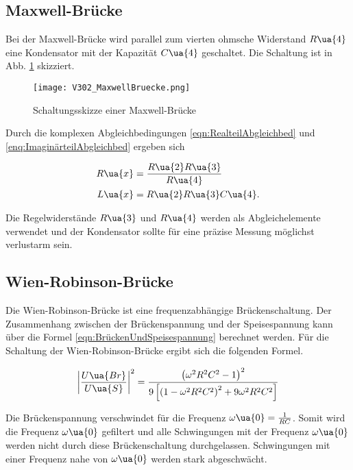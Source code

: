 \subsection{Maxwell-Brücke}

Bei der Maxwell-Brücke wird parallel zum vierten ohmsche Widerstand $R\ua{4}$
eine Kondensator mit der Kapazität $C\ua{4}$ geschaltet. Die Schaltung ist in
Abb. \ref{fig:Maxwell-Brücke} skizziert.

\begin{figure}
  \texttt{[image: V302\_MaxwellBruecke.png]}
  \caption{Schaltungsskizze einer Maxwell-Brücke\cite{anleitung01}}
  \label{fig:Maxwell-Brücke}
\end{figure}

Durch die komplexen Abgleichbedingungen \eqref{eqn:RealteilAbgleichbed} und
\eqref{enq:ImaginärteilAbgleichbed} ergeben sich

\begin{align}
  R\ua{x} &= \frac{R\ua{2}R\ua{3}}{R\ua{4}}\label{eqn:Maxwell_Rx}\\
  L\ua{x} &= R\ua{2}R\ua{3}C\ua{4}.\label{eqn:Maxwell_Lx}
\end{align}

Die Regelwiderstände $R\ua{3}$ und $R\ua{4}$ werden als Abgleichelemente verwendet
und der Kondensator sollte für eine präzise Messung möglichst verlustarm sein.

\subsection{Wien-Robinson-Brücke}
Die Wien-Robinson-Brücke ist eine frequenzabhängige Brückenschaltung. Der Zusammenhang
zwischen der Brückenspannung und der Speisespannung kann über die Formel
\eqref{eqn:BrückenUndSpeisespannung} berechnet werden. Für die Schaltung der
Wien-Robinson-Brücke ergibt sich die folgenden Formel.

\begin{equation}
  \label{eqn:Wien-Robinson-Brücke}
  \left|\frac{U\ua{Br}}{U\ua{S}}\right|^2 = \frac{\left(\omega^2R^2C^2 - 1\right)^2}{
  9\left[\left(1 - \omega^2R^2C^2\right)^2 + 9\omega^2R^2C^2\right]}
\end{equation}

Die Brückenspannung verschwindet für die Frequenz $\omega\ua{0} = \frac{1}{RC}$.
Somit wird die Frequenz $\omega\ua{0}$ gefiltert und alle Schwingungen mit
der Frequenz $\omega\ua{0}$ werden nicht durch diese Brückenschaltung durchgelassen.
Schwingungen mit einer Frequenz nahe von $\omega\ua{0}$ werden stark abgeschwächt.

